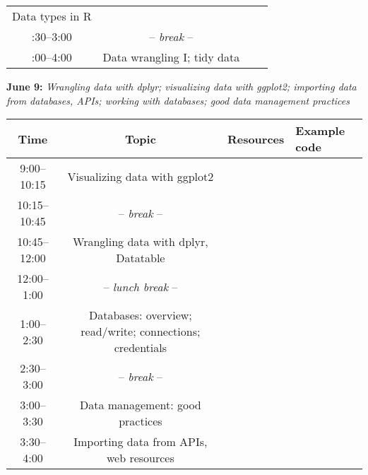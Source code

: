 \documentclass[
]{book}
\begin{document}
\begin{longtable}[]{@{}ccll@{}}
\begin{minipage}[t]{0.32\columnwidth}
Data types in R\strut
\end{minipage} & \begin{minipage}[t]{0.18\columnwidth}\raggedright
\strut
\end{minipage} & \begin{minipage}[t]{0.24\columnwidth}\raggedright
\strut
\end{minipage}\tabularnewline
\begin{minipage}[t]{0.15\columnwidth}\centering
2:30--3:00\strut
\end{minipage} & \begin{minipage}[t]{0.32\columnwidth}\centering
-- \emph{break} --\strut
\end{minipage} & \begin{minipage}[t]{0.18\columnwidth}\raggedright
\strut
\end{minipage} & \begin{minipage}[t]{0.24\columnwidth}\raggedright
\strut
\end{minipage}\tabularnewline
\begin{minipage}[t]{0.15\columnwidth}\centering
3:00--4:00\strut
\end{minipage} & \begin{minipage}[t]{0.32\columnwidth}\centering
Data wrangling I; tidy data\strut
\end{minipage} & \begin{minipage}[t]{0.18\columnwidth}\raggedright
\strut
\end{minipage} & \begin{minipage}[t]{0.24\columnwidth}\raggedright
\strut
\end{minipage}\tabularnewline
\bottomrule
\end{longtable}

\textbf{June 9:} \emph{Wrangling data with dplyr; visualizing data with ggplot2; importing data from databases, APIs; working with databases; good data management practices}

\begin{longtable}[]{@{}ccll@{}}
\toprule
Time & Topic & Resources & Example code\tabularnewline
\midrule
\endhead
9:00--10:15 & Visualizing data with ggplot2 & &\tabularnewline
10:15--10:45 & -- \emph{break} -- & &\tabularnewline
10:45--12:00 & Wrangling data with dplyr, Datatable & &\tabularnewline
12:00--1:00 & -- \emph{lunch break} -- & &\tabularnewline
1:00--2:30 & Databases: overview; read/write; connections; credentials & &\tabularnewline
2:30--3:00 & -- \emph{break} -- & &\tabularnewline
3:00--3:30 & Data management: good practices & &\tabularnewline
3:30--4:00 & Importing data from APIs, web resources & &\tabularnewline
\bottomrule
\end{longtable}
\end{document}

